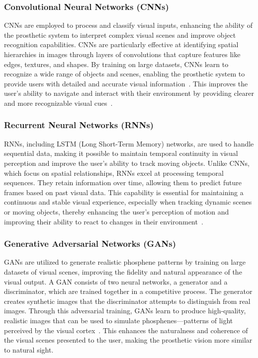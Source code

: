\documentclass[twocolumn,10pt]{article}
\begin{document}
\subsubsection*{Convolutional Neural Networks (CNNs)}
CNNs are employed to process and classify visual inputs, enhancing the ability
of the prosthetic system to interpret complex visual scenes and improve object
recognition capabilities. CNNs are particularly effective at identifying spatial
hierarchies in images through layers of convolutions that capture features like
edges, textures, and shapes. By training on large datasets, CNNs learn to
recognize a wide range of objects and scenes, enabling the prosthetic system to
provide users with detailed and accurate visual
information~\cite{petrosyanDecodingInterpretingCortical2021a}. This improves the
user's ability to navigate and interact with their environment by providing
clearer and more recognizable visual
cues~\cite{maheswaranathanInterpretingRetinalNeural2023}.

\subsubsection*{Recurrent Neural Networks (RNNs)}
RNNs, including LSTM (Long Short-Term Memory) networks, are used to handle
sequential data, making it possible to maintain temporal continuity in visual
perception and improve the user's ability to track moving objects. Unlike CNNs,
which focus on spatial relationships, RNNs excel at processing temporal
sequences. They retain information over time, allowing them to predict future
frames based on past visual data. This capability is essential for maintaining a
continuous and stable visual experience, especially when tracking dynamic scenes
or moving objects, thereby enhancing the user's perception of motion and
improving their ability to react to changes in their
environment~\cite{nayebiRecurrentConnectionsPrimate2022, liaoBridgingGapsResidual2016}.

\subsubsection*{Generative Adversarial Networks (GANs)}
GANs are utilized to generate realistic phosphene patterns by training on large
datasets of visual scenes, improving the fidelity and natural appearance of the
visual output. A GAN consists of two neural networks, a generator and a
discriminator, which are trained together in a competitive process. The
generator creates synthetic images that the discriminator attempts to
distinguish from real images. Through this adversarial training, GANs learn to
produce high-quality, realistic images that can be used to simulate
phosphenes—patterns of light perceived by the visual
cortex~\cite{goodfellowGenerativeAdversarialNetworks2020,elnabawyPVGANGenerativeAdversarial2022}.
This enhances the naturalness and coherence of the visual scenes presented to
the user, making the prosthetic vision more similar to natural sight.
\end{document}

